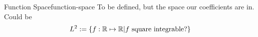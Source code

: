 \begin{definition}{Function Space}{function-space}
  To be defined, but the space our coefficients are in. Could be
  \[L^2 := \{f: \mathbb{R} \mapsto \mathbb{R} | f ~\text{square integrable?}\}\]
\end{definition}
